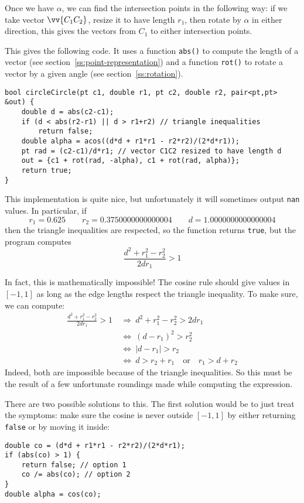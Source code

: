 Once we have $\alpha$, we can find the intersection points in the following way: if we take vector $\vv{C_1C_2}$, resize it to have length $r_1$, then rotate by $\alpha$ in either direction, this gives the vectors from $C_1$ to either intersection points.


This gives the following code. It uses a function \lstinline|abs()| to compute the length of a vector (see section~\ref{ss:point-representation}) and a function \lstinline|rot()| to rotate a vector by a given angle (see section~\ref{ss:rotation}).
\begin{lstlisting}
bool circleCircle(pt c1, double r1, pt c2, double r2, pair<pt,pt> &out) {
    double d = abs(c2-c1);
    if (d < abs(r2-r1) || d > r1+r2) // triangle inequalities
        return false;
    double alpha = acos((d*d + r1*r1 - r2*r2)/(2*d*r1));
    pt rad = (c2-c1)/d*r1; // vector C1C2 resized to have length d
    out = {c1 + rot(rad, -alpha), c1 + rot(rad, alpha)};
    return true;
}
\end{lstlisting}

This implementation is quite nice, but unfortunately it will sometimes output \lstinline|nan| values. In particular, if
\[r_1 = 0.625 \qquad r_2 = 0.3750000000000004 \qquad d = 1.0000000000000004\]
then the triangle inequalities are respected, so the function returns \lstinline|true|, but the program computes
\[\frac{d^2 + r_1^2 - r_2^2}{2dr_1} > 1\]

In fact, this is mathematically impossible! The cosine rule should give values in $[-1,1]$ as long as the edge lengths respect the triangle inequality. To make sure, we can compute:
\begin{align*}
\frac{d^2 + r_1^2 - r_2^2}{2dr_1} > 1\ 
&\Rightarrow\ d^2 + r_1^2 - r_2^2 > 2dr_1\\
&\Leftrightarrow\ (d-r_1)^2 > r_2^2\\
&\Leftrightarrow\ |d-r_1| > r_2\\
&\Leftrightarrow\ d > r_2+r_1 \quad\mbox{or}\quad r_1 > d+r_2
\end{align*}
Indeed, both are impossible because of the triangle inequalities. So this must be the result of a few unfortunate roundings made while computing the expression.

There are two possible solutions to this. The first solution would be to just treat the symptoms: make sure the cosine is never outside $[-1,1]$ by either returning \lstinline|false| or by moving it inside:
\begin{lstlisting}
double co = (d*d + r1*r1 - r2*r2)/(2*d*r1);
if (abs(co) > 1) {
    return false; // option 1
    co /= abs(co); // option 2
}
double alpha = cos(co);
\end{lstlisting}

